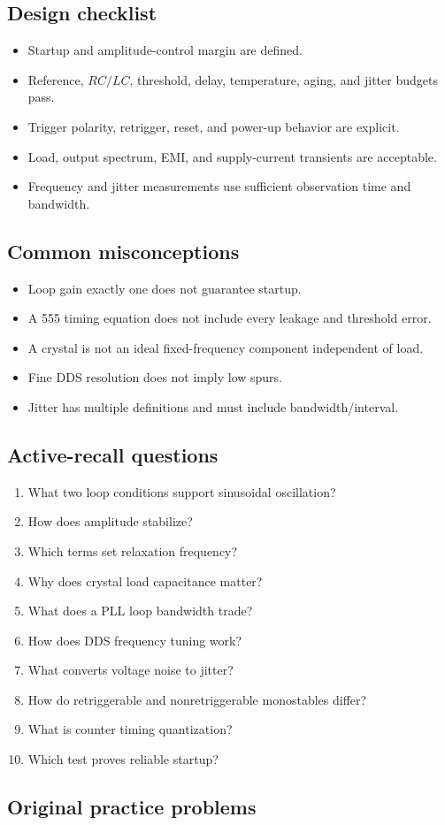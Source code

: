 \documentclass[10pt,letterpaper]{article}
\begin{document}
\subsection{Design checklist}
\begin{itemize}
  \item Startup and amplitude-control margin are defined.
  \item Reference, $RC/LC$, threshold, delay, temperature, aging, and jitter budgets pass.
  \item Trigger polarity, retrigger, reset, and power-up behavior are explicit.
  \item Load, output spectrum, EMI, and supply-current transients are acceptable.
  \item Frequency and jitter measurements use sufficient observation time and bandwidth.
\end{itemize}\subsection{Common misconceptions}
\begin{itemize}
  \item Loop gain exactly one does not guarantee startup.
  \item A 555 timing equation does not include every leakage and threshold error.
  \item A crystal is not an ideal fixed-frequency component independent of load.
  \item Fine DDS resolution does not imply low spurs.
  \item Jitter has multiple definitions and must include bandwidth/interval.
\end{itemize}\subsection{Active-recall questions}
\begin{enumerate}
  \item What two loop conditions support sinusoidal oscillation?
  \item How does amplitude stabilize?
  \item Which terms set relaxation frequency?
  \item Why does crystal load capacitance matter?
  \item What does a PLL loop bandwidth trade?
  \item How does DDS frequency tuning work?
  \item What converts voltage noise to jitter?
  \item How do retriggerable and nonretriggerable monostables differ?
  \item What is counter timing quantization?
  \item Which test proves reliable startup?
\end{enumerate}\subsection{Original practice problems}
\end{document}
